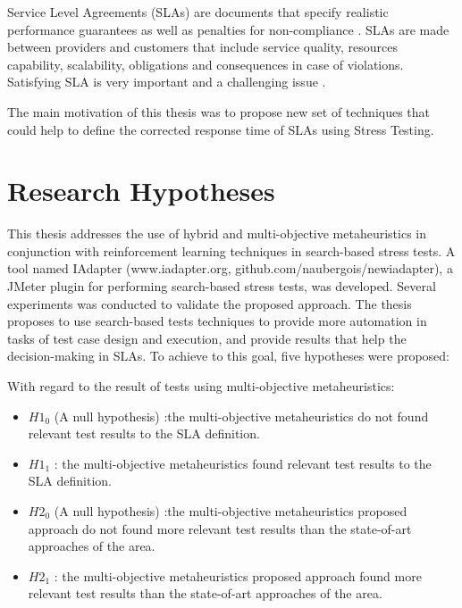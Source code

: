 \documentclass[espaco=umemeio,chapter=TITLE,twoside,openright]{abnt}
\begin{document}
Service Level Agreements (SLAs)  are documents that specify realistic performance guarantees as well as
penalties for non-compliance \cite{Menasce2002b}.   SLAs are made between providers and customers that include service quality, resources
capability, scalability, obligations and consequences in case of
violations. Satisfying SLA is very important and a challenging
issue \cite{Rajeshwari2016}. 

The main motivation of this thesis was to propose new set of techniques that could help to define the corrected response time of SLAs using Stress Testing. 

\section{Research Hypotheses}

This thesis addresses the use of hybrid and multi-objective metaheuristics in conjunction with reinforcement learning techniques in search-based stress tests. A tool named IAdapter (www.iadapter.org, github.com/naubergois/newiadapter), a JMeter plugin for performing search-based stress tests, was developed.  Several experiments was conducted to validate the proposed approach. The thesis proposes to use search-based tests techniques to provide more automation in tasks of test case design and execution, and provide results that help the decision-making in SLAs. To achieve to this goal, five hypotheses were proposed:

With regard to the result of tests using multi-objective  metaheuristics:
\begin{itemize}
\item $H1_{0}$ (A null hypothesis) :the multi-objective metaheuristics do not found relevant test results to the SLA definition.
\item $H1_{1}$  : the multi-objective metaheuristics  found relevant test results to the SLA definition.
\end{itemize}

\begin{itemize}
\item $H2_{0}$ (A null hypothesis) :the multi-objective metaheuristics proposed approach do not found more relevant test results than the state-of-art approaches of the area.
\item $H2_{1}$  : the multi-objective metaheuristics proposed approach found more relevant test results than the state-of-art approaches of the area.
\end{itemize}
\end{document}
